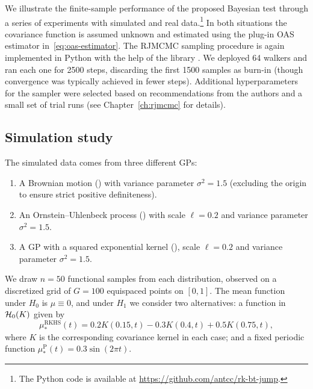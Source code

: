 We illustrate the finite-sample performance of the proposed Bayesian test through a series of experiments with simulated and real data.\footnote{The Python code is available at \url{https://github.com/antcc/rk-bt-jump}.} In both situations the covariance function is assumed unknown and estimated using the plug-in \acs{OAS} estimator in~\eqref{eq:oas-estimator}. The \acs{RJMCMC} sampling procedure is again implemented in Python with the help of the  library \citep{karnesis2023eryn}. We deployed 64 walkers and ran each one for 2500 steps, discarding the first 1500 samples as burn-in (though convergence was typically achieved in fewer steps). Additional hyperparameters for the sampler were selected based on recommendations from the authors and a small set of trial runs (see Chapter~\ref{ch:rjmcmc} for details).

\subsection{Simulation study} The simulated data comes from three different \acs{GPs}:
\begin{enumerate}
  \item A Brownian motion () with variance parameter \(\sigma^2=1.5\) (excluding the origin to ensure strict positive definiteness).
  \item An Ornstein--Uhlenbeck process () with scale \(\ell=0.2\) and variance parameter \(\sigma^2=1.5\).
  \item A \acs{GP} with a squared exponential kernel (), scale \(\ell=0.2\) and variance parameter \(\sigma^2=1.5\).
\end{enumerate}
We draw \(n=50\) functional samples from each distribution, observed on a discretized grid of \(G=100\) equispaced points on \([0,1]\). The mean function under \(H_0\) is \(\mu\equiv 0\), and under \(H_1\) we consider two alternatives: a function in \(\mathcal{H}_0(K)\) given by
\[
  \mu_*^{\text{RKHS}}(t) = 0.2K(0.15, t) - 0.3K(0.4, t) + 0.5K(0.75, t),
\]
where \(K\) is the corresponding covariance kernel in each case; and a fixed periodic function
\(
  \mu_*^{\text{P}}(t) = 0.3\sin(2\pi t).
\)

